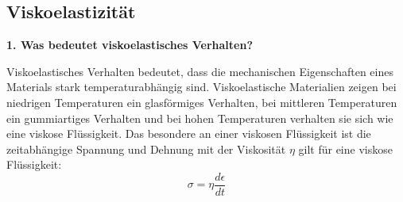 \subsection{Viskoelastizität}
\noindent\textbf{1. Was bedeutet \glqq viskoelastisches Verhalten\grqq ?}\\
\begin{addmargin}[25pt]{0pt}
Viskoelastisches Verhalten bedeutet, dass die mechanischen Eigenschaften eines Materials stark temperaturabhängig sind. Viskoelastische Materialien zeigen bei niedrigen Temperaturen ein glasförmiges Verhalten, bei mittleren Temperaturen ein gummiartiges Verhalten und bei hohen Temperaturen verhalten sie sich wie eine viskose Flüssigkeit. Das besondere an einer viskosen Flüssigkeit ist die zeitabhängige Spannung und Dehnung mit der Viskosität $\eta$ gilt für eine viskose Flüssigkeit:
\begin{equation}\label{eq:viskose_Spannung}
    \sigma = \eta \frac{\si{d}\epsilon}{\si{d}t}
\end{equation}
\end{addmargin} 

